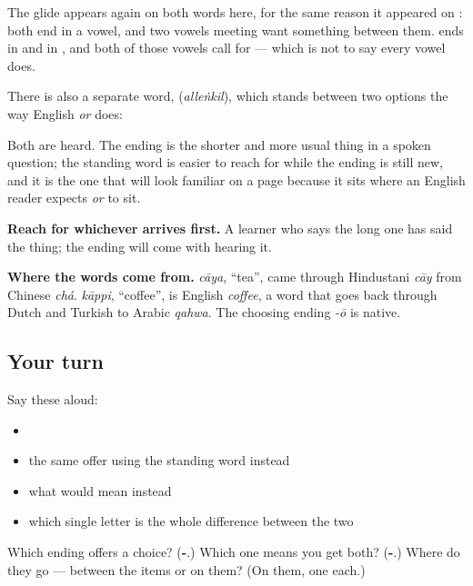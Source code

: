 The \textbf{} glide appears again on both words here, for the same reason it appeared on \textbf{}: both end in a vowel, and two vowels meeting want something between them. \textbf{} ends in \textbf{} and \textbf{} in \textbf{}, and both of those vowels call for \textbf{} — which is not to say every vowel does.

\begin{cousinweb}
There is also a separate word, \textbf{} (\emph{alleṅkil}), which stands between two options the way English \emph{or} does:

\begin{quote}
 \textbf{} 
\end{quote}

Both are heard. The ending is the shorter and more usual thing in a spoken question; the standing word is easier to reach for while the ending is still new, and it is the one that will look familiar on a page because it sits where an English reader expects \emph{or} to sit.

\textbf{Reach for whichever arrives first.} A learner who says the long one has said the thing; the ending will come with hearing it.

\textbf{Where the words come from.} \emph{cāya}, \textquotedblleft{}tea\textquotedblright{}, came through Hindustani \emph{cāy} from Chinese \emph{chá}. \emph{kāppi}, \textquotedblleft{}coffee\textquotedblright{}, is English \emph{coffee}, a word that goes back through Dutch and Turkish to Arabic \emph{qahwa}. The choosing ending \emph{-ō} is native.
\end{cousinweb}

\subsection*{Your turn}
Say these aloud:

\begin{itemize}
\raggedright
  \item {} 
  \item the same offer using the standing word instead
  \item what   would mean instead
  \item which single letter is the whole difference between the two
\end{itemize}

\begin{tcolorbox}[breakable,colback=teal!4,colframe=teal!35!black,title={Before you move on}]
Which ending offers a choice? (\textbf{-}.) Which one means you get both? (\textbf{-}.) Where do they go — between the items or on them? (On them, one each.)
\end{tcolorbox}
